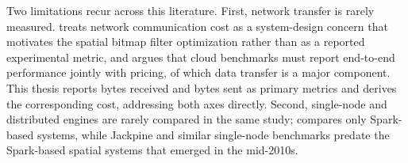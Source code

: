 Two limitations recur across this literature. First, network transfer is rarely measured. \textcite{tang2020_locationspark_distributed_spatial_query} treats network communication cost as a system-design concern that motivates the spatial bitmap filter optimization rather than as a reported experimental metric, and \textcite{folkerts2012_benchmarking_in_the_cloud} argues that cloud benchmarks must report end-to-end performance jointly with pricing, of which data transfer is a major component. This thesis reports bytes received and bytes sent as primary metrics and derives the corresponding cost, addressing both axes directly. Second, single-node and distributed engines are rarely compared in the same study; \textcite{pandey2018_how_good_modern_spatial_analytics} compares only Spark-based systems, while Jackpine and similar single-node benchmarks predate the Spark-based spatial systems that emerged in the mid-2010s.